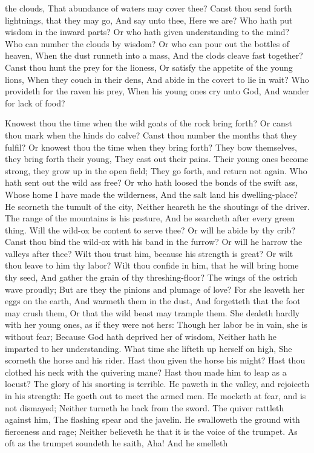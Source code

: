 the clouds, That abundance of waters may cover thee?  Canst thou send forth lightnings, that they may go, And say unto thee, Here we are?  Who hath put wisdom in the inward parts? Or who hath given understanding to the mind?  Who can number the clouds by wisdom? Or who can pour out the bottles of heaven,  When the dust runneth into a mass, And the clods cleave fast together?  Canst thou hunt the prey for the lioness, Or satisfy the appetite of the young lions,  When they couch in their dens, And abide in the covert to lie in wait?  Who provideth for the raven his prey, When his young ones cry unto God, And wander for lack of food? 

Knowest thou the time when the wild goats of the rock bring forth? Or canst thou mark when the hinds do calve?  Canst thou number the months that they fulfil? Or knowest thou the time when they bring forth?  They bow themselves, they bring forth their young, They cast out their pains.  Their young ones become strong, they grow up in the open field; They go forth, and return not again.  Who hath sent out the wild ass free? Or who hath loosed the bonds of the swift ass,  Whose home I have made the wilderness, And the salt land his dwelling-place?  He scorneth the tumult of the city, Neither heareth he the shoutings of the driver.  The range of the mountains is his pasture, And he searcheth after every green thing.  Will the wild-ox be content to serve thee? Or will he abide by thy crib?  Canst thou bind the wild-ox with his band in the furrow? Or will he harrow the valleys after thee?  Wilt thou trust him, because his strength is great? Or wilt thou leave to him thy labor?  Wilt thou confide in him, that he will bring home thy seed, And gather the grain of thy threshing-floor?  The wings of the ostrich wave proudly; But are they the pinions and plumage of love?  For she leaveth her eggs on the earth, And warmeth them in the dust,  And forgetteth that the foot may crush them, Or that the wild beast may trample them.  She dealeth hardly with her young ones, as if they were not hers: Though her labor be in vain, she is without fear;  Because God hath deprived her of wisdom, Neither hath he imparted to her understanding.  What time she lifteth up herself on high, She scorneth the horse and his rider.  Hast thou given the horse his might? Hast thou clothed his neck with the quivering mane?  Hast thou made him to leap as a locust? The glory of his snorting is terrible.  He paweth in the valley, and rejoiceth in his strength: He goeth out to meet the armed men.  He mocketh at fear, and is not dismayed; Neither turneth he back from the sword.  The quiver rattleth against him, The flashing spear and the javelin.  He swalloweth the ground with fierceness and rage; Neither believeth he that it is the voice of the trumpet.  As oft as the trumpet soundeth he saith, Aha! And he smelleth 